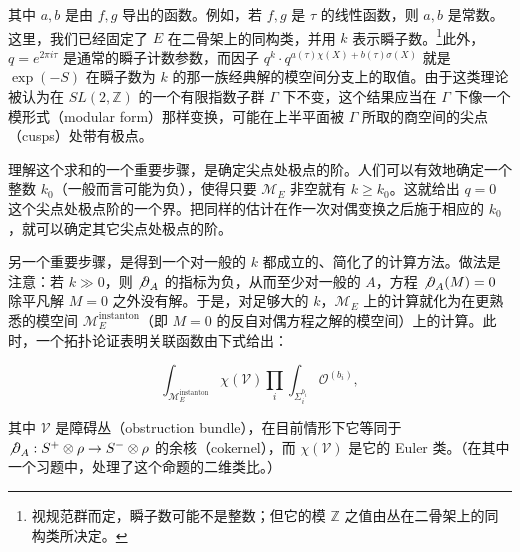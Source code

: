 其中 $a,b$ 是由 $f,g$ 导出的函数。例如，若 $f,g$ 是 $\tau$ 的线性函数，则 $a,b$ 是常数。这里，我们已经固定了 $E$ 在二骨架上的同构类，并用 $k$ 表示瞬子数。\footnote{视规范群而定，瞬子数可能不是整数；但它的模 $\mathbb{Z}$ 之值由丛在二骨架上的同构类所决定。}此外，$q=e^{2\pi i\tau}$ 是通常的瞬子计数参数，而因子 $q^k\cdot q^{a(\tau)\chi(X)+b(\tau)\sigma(X)}$ 就是 $\exp(-S)$ 在瞬子数为 $k$ 的那一族经典解的模空间分支上的取值。由于这类理论被认为在 $SL(2,\mathbb{Z})$ 的一个有限指数子群 $\Gamma$ 下不变，这个结果应当在 $\Gamma$ 下像一个模形式（modular form）那样变换，可能在上半平面被 $\Gamma$ 所取的商空间的尖点（cusps）处带有极点。


理解这个求和的一个重要步骤，是确定尖点处极点的阶。人们可以有效地确定一个整数 $k_0$（一般而言可能为负），使得只要 $\mathcal M_E$ 非空就有 $k\ge k_0$。这就给出 $q=0$ 这个尖点处极点阶的一个界。把同样的估计在作一次对偶变换之后施于相应的 $k_0$，就可以确定其它尖点处极点的阶。

另一个重要步骤，是得到一个对一般的 $k$ 都成立的、简化了的计算方法。做法是注意：若 $k\gg0$，则 ${\not\partial}_A$ 的指标为负，从而至少对一般的 $A$，方程 ${\not\partial}_A(M)=0$ 除平凡解 $M=0$ 之外没有解。于是，对足够大的 $k$，$\mathcal M_E$ 上的计算就化为在更熟悉的模空间 $\mathcal M_E^{\text{instanton}}$（即 $M=0$ 的反自对偶方程之解的模空间）上的计算。此时，一个拓扑论证表明关联函数由下式给出：

\[
  \int_{\mathcal M_E^{\text{instanton}}}\chi(\mathcal V)
  \prod_i\int_{\Sigma_i^{b_i}}\mathcal O^{(b_i)},
\]

其中 $\mathcal V$ 是障碍丛（obstruction bundle），在目前情形下它等同于 ${\not\partial}_A:S^+\otimes\rho\to S^-\otimes\rho$ 的余核（cokernel），而 $\chi(\mathcal V)$ 是它的 Euler 类。（在其中一个习题中，处理了这个命题的二维类比。）


